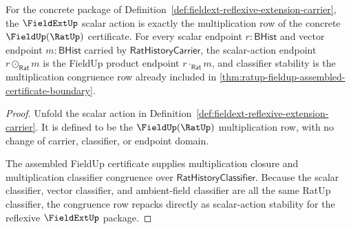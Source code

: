 \begin{theorem}
\label{thm:fieldext-ratup-reflexive-scalar-action-readback}
For the concrete package of
Definition~\ref{def:fieldext-reflexive-extension-carrier}, the $\FieldExtUp$
scalar action is exactly the multiplication row of the concrete
$\FieldUp(\RatUp)$ certificate. For every scalar endpoint
$r:\mathsf{BHist}$ and vector endpoint $m:\mathsf{BHist}$ carried by
$\mathsf{RatHistoryCarrier}$, the scalar-action endpoint
$r\odot_{\mathsf{Rat}} m$ is the FieldUp product endpoint
$r\cdot_{\mathsf{Rat}} m$, and classifier stability is the multiplication
congruence row already included in
\autoref{thm:ratup-fieldup-assembled-certificate-boundary}.
\end{theorem}
\begin{proof}
Unfold the scalar action in
Definition~\ref{def:fieldext-reflexive-extension-carrier}. It is defined to be
the $\FieldUp(\RatUp)$ multiplication row, with no change of carrier,
classifier, or endpoint domain.

The assembled FieldUp certificate supplies multiplication closure and
multiplication classifier congruence over $\mathsf{RatHistoryClassifier}$.
Because the scalar classifier, vector classifier, and ambient-field classifier
are all the same RatUp classifier, the congruence row repacks directly as
scalar-action stability for the reflexive $\FieldExtUp$ package.
\end{proof}

